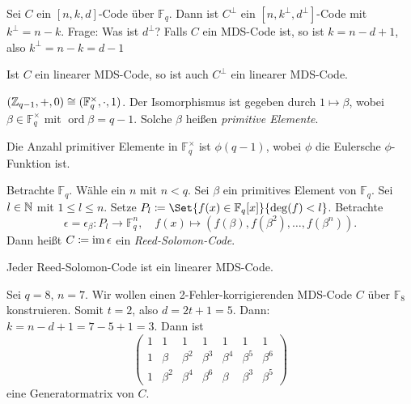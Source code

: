 \documentclass{cheat-sheet}
\newcommand{\F}{\mathbb{F}} %
\DeclareMathOperator{\ord}{ord} %
\begin{document}

Sei $C$ ein $[n, k, d]$-Code über $\F_q$.
Dann ist $C^\perp$ ein $[n, k^\perp, d^\perp]$-Code mit $k^\perp = n - k$.
Frage: Was ist $d^\perp$?
Falls $C$ ein MDS-Code ist, so ist $k = n - d + 1$, also $k^\perp = n - k = d - 1$

\begin{satz}
  Ist $C$ ein linearer MDS-Code, so ist auch $C^\perp$ ein linearer MDS-Code.
\end{satz}


\begin{lem}
  $(\Z_{q-1}, +, 0) \cong (\F_q^{\times}, \cdot, 1)$.
  Der Isomorphismus ist gegeben durch $1 \mapsto \beta$, wobei $\beta \in \F_q^{\times}$ mit $\ord{\beta} = q-1$.
  Solche $\beta$ heißen \emph{primitive Elemente}.
\end{lem}

\begin{bem}
  Die Anzahl primitiver Elemente in $\F_q^{\times}$ ist $\phi(q-1)$, wobei $\phi$ die Eulersche $\phi$-Funktion ist.
\end{bem}

\begin{defn}
  Betrachte $\F_q$.
  Wähle ein $n$ mit $n < q$.
  Sei $\beta$ ein primitives Element von $\F_q$.
  Sei $l \in \mathbb{N}$ mit $1 \leq l \leq n$.
  Setze $P_l \coloneqq \Set{f(x) \in \F_q[x]}{\deg(f) < l}$.
  Betrachte
  \[
    \epsilon = \epsilon_\beta : P_l \to \F_q^n, \quad
    f(x) \mapsto (f(\beta), f(\beta^2), \ldots, f(\beta^n)).
  \]
  Dann heißt $C \coloneqq \operatorname{im} \epsilon$ ein \emph{Reed-Solomon-Code}.
\end{defn}

\begin{satz}
  Jeder Reed-Solomon-Code ist ein linearer MDS-Code.
\end{satz}


\begin{bsp}
  Sei $q = 8$, $n = 7$.
  Wir wollen einen 2-Fehler-korrigierenden MDS-Code $C$ über $\F_8$ konstruieren.
  Somit $t = 2$, also $d = 2t + 1 = 5$.
  Dann: $k = n - d + 1 = 7 - 5 + 1 = 3$.
  Dann ist
  \[
    \begin{pmatrix}
      1 & 1 & 1 & 1 & 1 & 1 & 1 \\
      1 & \beta & \beta^2 & \beta^3 & \beta^4 & \beta^5 & \beta^6 \\
      1 & \beta^2 & \beta^4 & \beta^6 & \beta & \beta^3 & \beta^5
    \end{pmatrix}
  \]
  eine Generatormatrix von $C$.
\end{bsp}
\end{document}
